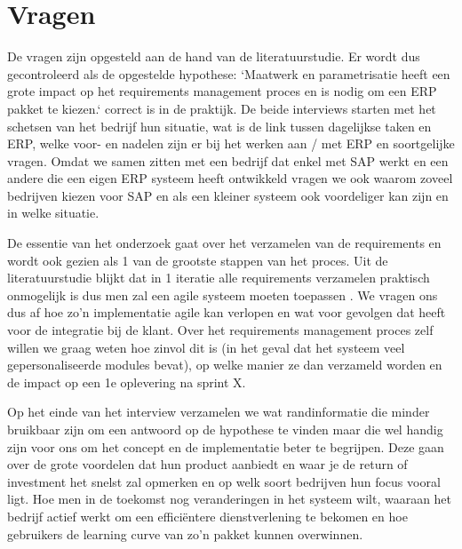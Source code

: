 
\chapter{Vragen}
\label{ch:vraagstelling}

De vragen zijn opgesteld aan de hand van de literatuurstudie. Er wordt dus gecontroleerd als de opgestelde hypothese: `Maatwerk en parametrisatie heeft een grote impact op het requirements management proces en is nodig om een ERP pakket te kiezen.` correct is in de praktijk. De beide interviews starten met het schetsen van het bedrijf hun situatie, wat is de link tussen dagelijkse taken en ERP, welke voor- en nadelen zijn er bij het werken aan / met ERP en soortgelijke vragen. Omdat we samen zitten met een bedrijf dat enkel met SAP werkt en een andere die een eigen ERP systeem heeft ontwikkeld vragen we ook waarom zoveel bedrijven kiezen voor SAP en als een kleiner systeem ook voordeliger kan zijn en in welke situatie. 

De essentie van het onderzoek gaat over het verzamelen van de requirements en wordt ook gezien als 1 van de grootste stappen van het proces. Uit de literatuurstudie blijkt dat in 1 iteratie alle requirements verzamelen praktisch onmogelijk is dus men zal een agile systeem moeten toepassen \autocite{Vollmer2016}. We vragen ons dus af hoe zo'n implementatie agile kan verlopen en wat voor gevolgen dat heeft voor de integratie bij de klant. Over het requirements management proces zelf willen we graag weten hoe zinvol dit is (in het geval dat het systeem veel gepersonaliseerde modules bevat), op welke manier ze dan verzameld worden en de impact op een 1e oplevering na sprint X.

Op het einde van het interview verzamelen we wat randinformatie die minder bruikbaar zijn om een antwoord op de hypothese te vinden maar die wel handig zijn voor ons om het concept en de implementatie beter te begrijpen. Deze gaan over de grote voordelen dat hun product aanbiedt en waar je de return of investment het snelst zal opmerken en op welk soort bedrijven hun focus vooral ligt. Hoe men in de toekomst nog veranderingen in het systeem wilt, waaraan het bedrijf actief werkt om een efficiëntere dienstverlening te bekomen en hoe gebruikers de learning curve van zo'n pakket kunnen overwinnen.